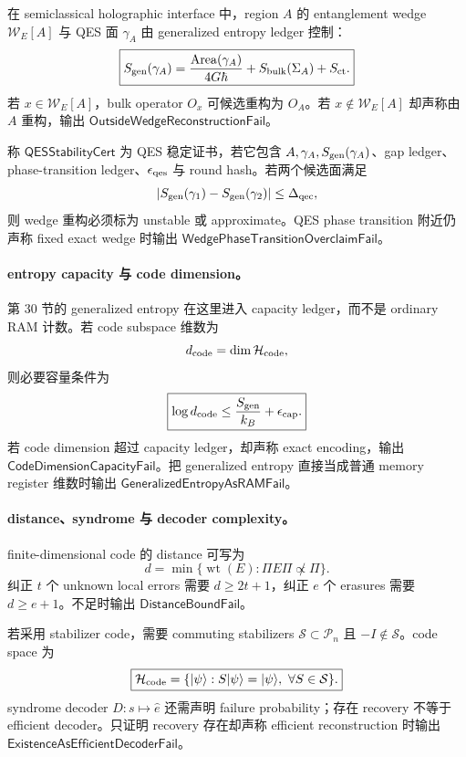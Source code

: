 在 semiclassical holographic interface 中，region \(A\) 的 entanglement wedge \(\mathcal W_E[A]\) 与 QES 面 \(\gamma_A\) 由 generalized entropy ledger 控制：
\[
\boxed{
S_{\rm gen}(\gamma_A)
=
\frac{{\rm Area}(\gamma_A)}{4G\hbar}
+S_{\rm bulk}(\Sigma_A)
+S_{\rm ct}.
}
\]
若 \(x\in\mathcal W_E[A]\)，bulk operator \(O_x\) 可候选重构为 \(O_A\)。若 \(x\notin\mathcal W_E[A]\) 却声称由 \(A\) 重构，输出 \(\mathsf{OutsideWedgeReconstructionFail}\)。

\begin{definition}\label{def:typed-address-biaxial-completion-qes-stability-cert}
称 \(\mathsf{QESStabilityCert}\) 为 QES 稳定证书，若它包含 \(A,\gamma_A,S_{\rm gen}(\gamma_A)\)、gap ledger、phase-transition ledger、\(\epsilon_{\rm qes}\) 与 round hash。若两个候选面满足
\[
|S_{\rm gen}(\gamma_1)-S_{\rm gen}(\gamma_2)|
\le
\Delta_{\rm qec},
\]
则 wedge 重构必须标为 unstable 或 approximate。QES phase transition 附近仍声称 fixed exact wedge 时输出 \(\mathsf{WedgePhaseTransitionOverclaimFail}\)。
\end{definition}

\paragraph{entropy capacity 与 code dimension。}
第 30 节的 generalized entropy 在这里进入 capacity ledger，而不是 ordinary RAM 计数。若 code subspace 维数为
\[
d_{\rm code}=\dim\mathcal H_{\rm code},
\]
则必要容量条件为
\[
\boxed{
\log d_{\rm code}
\le
\frac{S_{\rm gen}}{k_B}
+\epsilon_{\rm cap}.
}
\]
若 code dimension 超过 capacity ledger，却声称 exact encoding，输出 \(\mathsf{CodeDimensionCapacityFail}\)。把 generalized entropy 直接当成普通 memory register 维数时输出 \(\mathsf{GeneralizedEntropyAsRAMFail}\)。

\paragraph{distance、syndrome 与 decoder complexity。}
finite-dimensional code 的 distance 可写为
\[
\boxed{
d=\min\{\operatorname{wt}(E):\Pi E\Pi\not\propto\Pi\}.
}
\]
纠正 \(t\) 个 unknown local errors 需要 \(d\ge2t+1\)，纠正 \(e\) 个 erasures 需要 \(d\ge e+1\)。不足时输出 \(\mathsf{DistanceBoundFail}\)。

若采用 stabilizer code，需要 commuting stabilizers \(\mathcal S\subset\mathcal P_n\) 且 \(-I\notin\mathcal S\)。code space 为
\[
\boxed{
\mathcal H_{\rm code}
=
\{|\psi\rangle:S|\psi\rangle=|\psi\rangle,\ \forall S\in\mathcal S\}.
}
\]
syndrome decoder \(D:s\mapsto\hat e\) 还需声明 failure probability；存在 recovery 不等于 efficient decoder。只证明 recovery 存在却声称 efficient reconstruction 时输出 \(\mathsf{ExistenceAsEfficientDecoderFail}\)。


